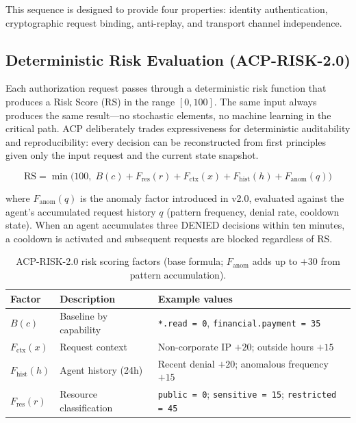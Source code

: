 \documentclass[11pt]{article}
\theoremstyle{definition}
\begin{document}
This sequence is designed to provide four properties:
identity authentication, cryptographic request binding, anti-replay, and transport channel independence.

\subsection{Deterministic Risk Evaluation (ACP-RISK-2.0)}

Each authorization request passes through a deterministic risk function that produces a Risk Score (RS) in the range $[0, 100]$.
The same input always produces the same result---no stochastic elements, no machine learning in the critical path.
ACP deliberately trades expressiveness for deterministic auditability and reproducibility: every decision can be reconstructed from first principles given only the input request and the current state snapshot.

\[
\text{RS} = \min\!\bigl(100,\; B(c) + F_{\text{res}}(r) + F_{\text{ctx}}(x) + F_{\text{hist}}(h) + F_{\text{anom}}(q)\bigr)
\]

\noindent where $F_{\text{anom}}(q)$ is the anomaly factor introduced in v2.0, evaluated against the agent's accumulated request history $q$ (pattern frequency, denial rate, cooldown state). When an agent accumulates three DENIED decisions within ten minutes, a cooldown is activated and subsequent requests are blocked regardless of RS.

\begin{table}[h!]
\centering
\small
\begin{tabular}{@{}llp{5.5cm}@{}}
\toprule
\textbf{Factor} & \textbf{Description} & \textbf{Example values} \\
\midrule
$B(c)$ & Baseline by capability & \texttt{*.read = 0}, \texttt{financial.payment = 35} \\
$F_{\text{ctx}}(x)$ & Request context & Non-corporate IP $+20$; outside hours $+15$ \\
$F_{\text{hist}}(h)$ & Agent history (24h) & Recent denial $+20$; anomalous frequency $+15$ \\
$F_{\text{res}}(r)$ & Resource classification & \texttt{public = 0}; \texttt{sensitive = 15}; \texttt{restricted = 45} \\
\bottomrule
\end{tabular}
\caption{ACP-RISK-2.0 risk scoring factors (base formula; $F_{\text{anom}}$ adds up to $+30$ from pattern accumulation).}
\end{table}
\end{document}
